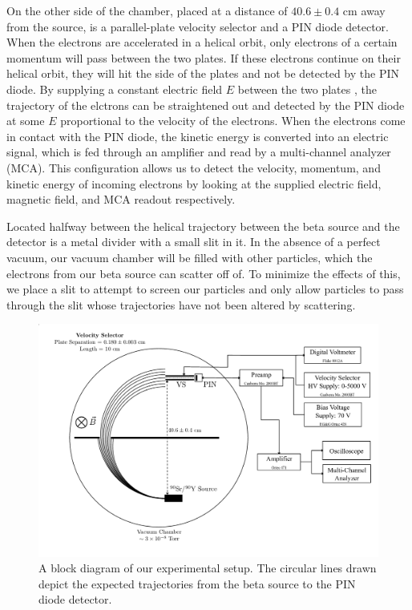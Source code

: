 On the other side of the chamber, placed at a distance of $40.6 \pm 0.4$ cm away from the source, is a parallel-plate velocity selector and a PIN diode detector. When the electrons are accelerated in a helical orbit, only electrons of a certain momentum will pass between the two plates. If these electrons continue on their helical orbit, they will hit the side of the plates and not be detected by the PIN diode. By supplying a constant electric field $E$ between the two plates , the trajectory of the elctrons can be straightened out and detected by the PIN diode at some $E$ proportional to the velocity of the electrons. When the electrons come in contact with the PIN diode, the kinetic energy is converted into an electric signal, which is fed through an amplifier and read by a multi-channel analyzer (MCA). This configuration allows us to detect the velocity, momentum, and kinetic energy of incoming electrons by looking at the supplied electric field, magnetic field, and MCA readout respectively.

Located halfway between the helical trajectory between the beta source and the detector is a metal divider with a small slit in it. In the absence of a perfect vacuum, our vacuum chamber will be filled with other particles, which the electrons from our beta source can scatter off of. To minimize the effects of this, we place a slit to attempt to screen our particles and only allow particles to pass through the slit whose trajectories have not been altered by scattering.

\begin{figure}[h]
  \includegraphics[width=.5\textwidth]{setup.png}
  \caption{A block diagram of our experimental setup. The circular lines drawn depict the expected trajectories from the beta source to the PIN diode detector.}
\end{figure}

